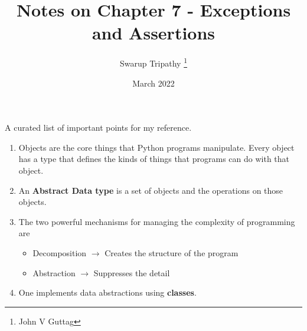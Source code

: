 \documentclass[11pt]{article}
\title{Notes on Chapter 7 - Exceptions and Assertions}
\author{Swarup Tripathy \thanks{John V Guttag}}
\date{March 2022}
\begin{document}
    \maketitle
    A curated list of important points for my reference.\\
    \begin{enumerate}
        \item Objects are the core things that Python programs manipulate. Every object has a type that defines the kinds of things that programs can do with that object.
        \item An \textbf{Abstract Data type} is a set of objects and the operations on those objects.
        \item The two powerful mechanisms for managing the complexity of programming are 
        \begin{itemize}
            \item Decomposition $\rightarrow$ Creates the structure of the program
            \item Abstraction $\rightarrow$ Suppresses the detail
        \end{itemize}   
        \item One implements data abstractions using \textbf{classes}.     
    \end{enumerate}
\end{document}
